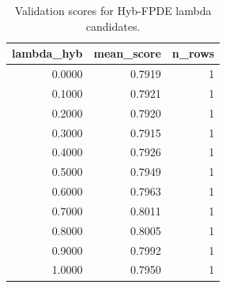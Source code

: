 \begin{table}[t]
\caption{Validation scores for Hyb-FPDE lambda candidates.}
\label{tab:lambda_distribution_computed}
\centering
\begin{tabular}{rrr}
\toprule
lambda\_hyb & mean\_score & n\_rows \\
\midrule
0.0000 & 0.7919 & 1 \\
0.1000 & 0.7921 & 1 \\
0.2000 & 0.7920 & 1 \\
0.3000 & 0.7915 & 1 \\
0.4000 & 0.7926 & 1 \\
0.5000 & 0.7949 & 1 \\
0.6000 & 0.7963 & 1 \\
0.7000 & 0.8011 & 1 \\
0.8000 & 0.8005 & 1 \\
0.9000 & 0.7992 & 1 \\
1.0000 & 0.7950 & 1 \\
\bottomrule
\end{tabular}

\end{table}
